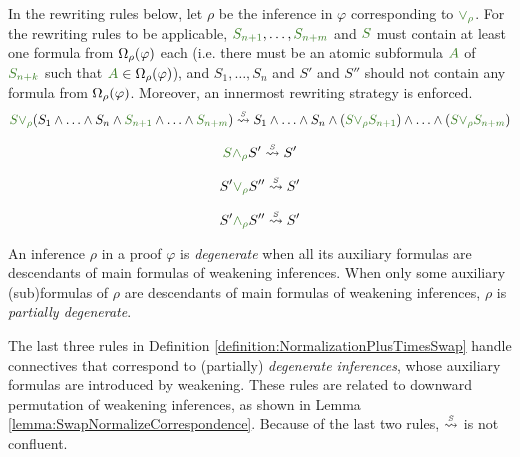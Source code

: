 \begin{definition}[$\normalizePlusTimesS$]
\label{definition:NormalizationPlusTimesSwap}
In the rewriting rules below, let $\rho$ be the inference in $\varphi$ corresponding to $\hF{\structtimes_{\rho}}$. For the rewriting rules to be applicable, 
$\hF{S_{n+1}}, \ldots, \hF{S_{n+m}}$ and $\hF{S}$ must contain at least one formula from $\Omega_{\rho}(\varphi)$ each (i.e. there must be an atomic subformula $\hF{A}$ of $\hF{S_{n+k}}$ such that $\hF{A} \in \occInference{\varphi}{\rho}$), and $S_1, \ldots, S_n$ and $S'$ and $S''$ should not contain any formula from $\Omega_{\rho}(\varphi)$. Moreover, an innermost rewriting strategy is enforced.
$$
\hF{S} \hF{\structtimes_{\rho}} (S_1 \structplus \ldots \structplus S_n \structplus \hF{S_{n+1}} \structplus \ldots \structplus \hF{S_{n+m}}) \normalizePlusTimesS  S_1 \structplus \ldots \structplus S_n \structplus (\hF{S} \hF{\structtimes_{\rho}} \hF{S_{n+1}}) \structplus \ldots \structplus (\hF{S} \hF{\structtimes_{\rho}} \hF{S_{n+m}}) 
$$
\begin{multicols}{3}{
$$
\hF{S} \hF{\structplus_{\rho}} S' \normalizePlusTimesS  S'
$$

$$
S' \hF{\structtimes_{\rho}} S'' \normalizePlusTimesS  S'
$$

$$
S' \hF{\structplus_{\rho}} S'' \normalizePlusTimesS  S'
$$
}\end{multicols}

\end{definition}

\begin{definition}
An inference $\rho$ in a proof $\varphi$ is \emph{degenerate} when all its 
auxiliary formulas are descendants of main formulas of 
weakening inferences. When only some auxiliary (sub)formulas of $\rho$ are descendants of main formulas of weakening inferences, $\rho$ is \emph{partially degenerate}.
\end{definition}


\begin{remark}
The last three rules in Definition \ref{definition:NormalizationPlusTimesSwap} handle connectives that correspond to (partially) \emph{degenerate inferences}, whose auxiliary formulas are introduced by weakening. These rules are related to downward permutation of weakening inferences, as shown in Lemma \ref{lemma:SwapNormalizeCorrespondence}. Because of the last two rules, $\normalizePlusTimesS$ is not confluent.
\end{remark}


